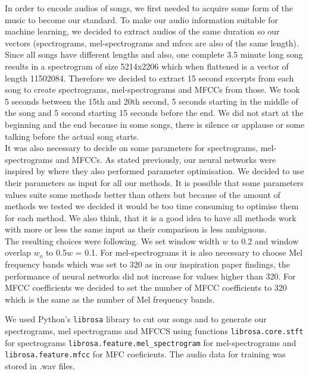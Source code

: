 In order to encode audios of songs, we first needed to acquire some form of the music to become our standard. To make our audio information suitable for machine learning, we decided to extract audios of the same duration so our vectors (spectrograms, mel-spectrograms and mfccs are also of the same length). Since all songs have different lengths and also, one complete 3.5 minute long song results in a spectrogram of size 5214x2206 which when flattened is a vector of length 11502084. Therefore we decided to extract 15 second excerpts from each song to create spectrograms, mel-spectrograms and MFCCs from those. We took 5 seconds between the 15th and 20th second, 5 seconds starting in the middle of the song and 5 second starting 15 seconds before the end. We did not start at the beginning and the end because in some songs, there is silence or applause or some talking before the actual song starts. \\

It was also necessary to decide on some parameters for spectrograms, mel-spectrograms and MFCCs. As stated previously, our neural networks were inspired by \cite{inproceedings_RNNs} where they also performed parameter optimisation. We decided to use their parameters as input for all our methods. It is possible that some parameters values suite some methods better than others but because of the amount of methods we tested we decided it would be too time consuming to optimise them for each method. We also think, that it is a good idea to have all methods work with more or less the same input as their comparison is less ambiguous. \\
The resulting choices were following. We set window width $w$ to 0.2 and window overlap $w_o$ to 0.5$w$ = 0.1. For mel-spectrograms it is also necessary to choose Mel frequency bands which was set to 320 as in our inspiration paper findings, the performance of neural networks did not increase for values higher than 320. For MFCC coefficients we decided to set the number of MFCC coefficients to 320 which is the same as the number of Mel frequency bands.

We used Python's \texttt{librosa} library \cite{brian_mcfee_2019_2564164} to cut our songs and to generate our spectrograms, mel spectrograms and MFCCS using functions \texttt{librosa.core.stft} for spectrograms \texttt{librosa.feature.mel\_spectrogram} for mel-spectrograms and \texttt{librosa.feature.mfcc} for MFC coeficients. The audio data for training was stored in .wav files.

